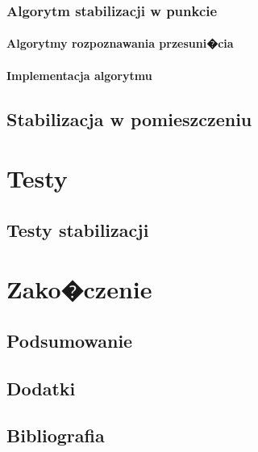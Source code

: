 \documentclass[12pt,a4paper,twoside,openright,fleqn]{mwrep}
\begin{document}
	\section{Algorytm stabilizacji w punkcie}	
	
		\subsection{Algorytmy rozpoznawania przesuni�cia}
		
		\subsection{Implementacja algorytmu}
		


\chapter{Stabilizacja w pomieszczeniu}


	
\part{Testy}
\chapter{Testy stabilizacji}


\part{Zako�czenie}
\chapter{Podsumowanie}

\chapter{Dodatki}

\chapter{Bibliografia}
\end{document}
